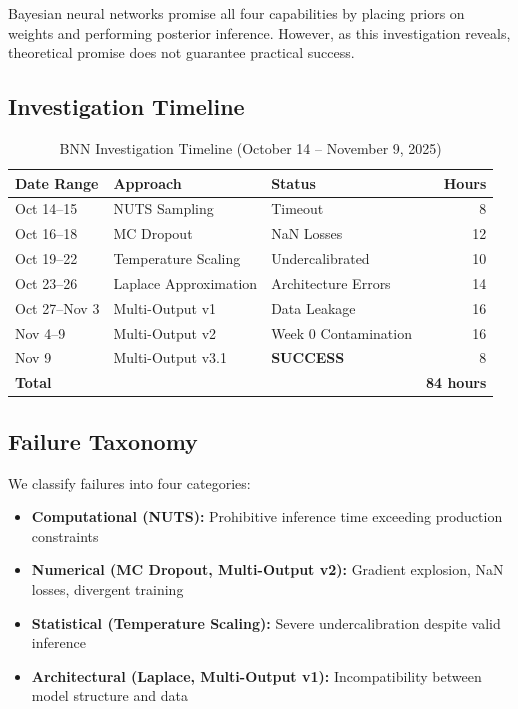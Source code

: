 Bayesian neural networks promise all four capabilities by placing priors on weights and performing posterior inference. However, as this investigation reveals, theoretical promise does not guarantee practical success.

\subsection{Investigation Timeline}

\begin{table}[!ht]
\centering
\caption{BNN Investigation Timeline (October 14 -- November 9, 2025)}
\begin{tabular}{@{} l l l r @{}}
\toprule
\textbf{Date Range}  & \textbf{Approach}  & \textbf{Status}  & \textbf{Hours} \\
\midrule
Oct 14--15 & NUTS Sampling & Timeout & 8 \\
Oct 16--18 & MC Dropout & NaN Losses & 12 \\
Oct 19--22 & Temperature Scaling & Undercalibrated & 10 \\
Oct 23--26 & Laplace Approximation & Architecture Errors & 14 \\
Oct 27--Nov 3 & Multi-Output v1 & Data Leakage & 16 \\
Nov 4--9 & Multi-Output v2 & Week 0 Contamination & 16 \\
Nov 9 & Multi-Output v3.1 & \textbf{SUCCESS} & 8 \\
\midrule
\textbf{Total} & & & \textbf{84 hours} \\
\bottomrule
\end{tabular}
\end{table}

\subsection{Failure Taxonomy}

We classify failures into four categories:

\begin{itemize}
  \item \textbf{Computational (NUTS):} Prohibitive inference time exceeding production constraints
  \item \textbf{Numerical (MC Dropout, Multi-Output v2):} Gradient explosion, NaN losses, divergent training
  \item \textbf{Statistical (Temperature Scaling):} Severe undercalibration despite valid inference
  \item \textbf{Architectural (Laplace, Multi-Output v1):} Incompatibility between model structure and data
\end{itemize}

